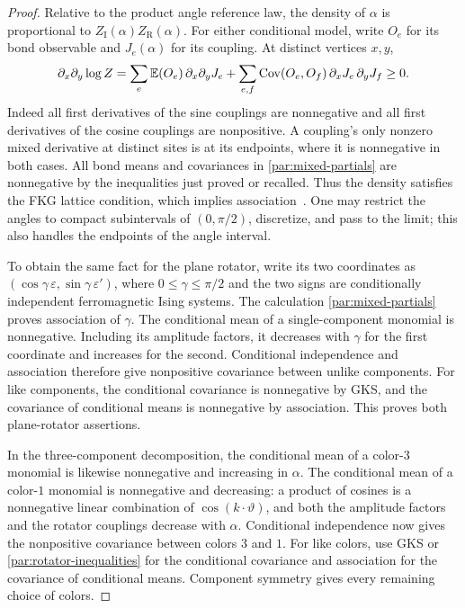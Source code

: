 \begin{proof}
Relative to the product angle reference law, the density of $\alpha$ is
proportional to $Z_{\mathrm I}(\alpha)Z_{\mathrm R}(\alpha)$. For either
conditional model, write $O_e$ for its bond observable and $J_e(\alpha)$
for its coupling. At distinct vertices $x,y$,
\begin{equation}\label{par:mixed-partials}
 \partial_x\partial_y\log Z
 =\sum_e\mathbb E(O_e)\,\partial_x\partial_yJ_e
  +\sum_{e,f}\operatorname{Cov}(O_e,O_f)\,
                      \partial_xJ_e\,\partial_yJ_f\ge0.
\end{equation}
Indeed all first derivatives of the sine couplings are nonnegative and all
first derivatives of the cosine couplings are nonpositive. A coupling's
only nonzero mixed derivative at distinct sites is at its endpoints, where
it is nonnegative in both cases. All bond means and covariances in
\eqref{par:mixed-partials} are nonnegative by the inequalities just proved
or recalled. Thus the density satisfies the FKG lattice condition, which
implies association~\cite{FKG1971}. One may restrict the angles to compact
subintervals of $(0,\pi/2)$, discretize, and pass to the limit; this also
handles the endpoints of the angle interval.

To obtain the same fact for the plane rotator, write its two coordinates
as $(\cos\gamma\,\varepsilon,\sin\gamma\,\varepsilon')$, where
$0\le\gamma\le\pi/2$ and the two signs are conditionally independent
ferromagnetic Ising systems. The calculation
\eqref{par:mixed-partials} proves association of $\gamma$. The conditional
mean of a single-component monomial is nonnegative. Including its
amplitude factors, it decreases with $\gamma$ for the first coordinate
and increases for the second. Conditional independence and association
therefore give nonpositive covariance between unlike components. For like
components, the conditional covariance is nonnegative by GKS, and the
covariance of conditional means is nonnegative by association. This proves
both plane-rotator assertions.

In the three-component decomposition, the conditional mean of a
color-$3$ monomial is likewise nonnegative and increasing in $\alpha$.
The conditional mean of a color-$1$ monomial is nonnegative and decreasing:
a product of cosines is a nonnegative linear combination of
$\cos(k\cdot\vartheta)$, and both the amplitude factors and the rotator
couplings decrease with $\alpha$. Conditional independence now gives the
nonpositive covariance between colors $3$ and $1$. For like colors, use
GKS or \eqref{par:rotator-inequalities} for the conditional covariance and
association for the covariance of conditional means. Component symmetry
gives every remaining choice of colors.
\end{proof}

